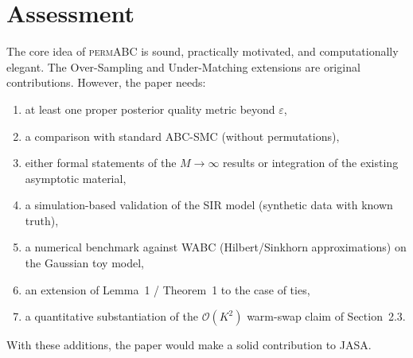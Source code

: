 \documentclass[11pt,a4paper]{article}
\begin{document}
\section*{Assessment}

The core idea of \textsc{permABC} is sound, practically motivated, and computationally elegant. The Over-Sampling and Under-Matching extensions are original contributions. However, the paper needs:
\begin{enumerate}[nosep]
    \item at least one proper posterior quality metric beyond $\varepsilon$,
    \item a comparison with standard ABC-SMC (without permutations),
    \item either formal statements of the $M \to \infty$ results or integration of the existing asymptotic material,
    \item a simulation-based validation of the SIR model (synthetic data with known truth),
    \item a numerical benchmark against \textsc{WABC} (Hilbert/Sinkhorn approximations) on the Gaussian toy model,
    \item an extension of Lemma~1 / Theorem~1 to the case of ties,
    \item a quantitative substantiation of the $\mathcal{O}(K^2)$ warm-swap claim of Section~2.3.
\end{enumerate}

\noindent With these additions, the paper would make a solid contribution to JASA.
\end{document}
